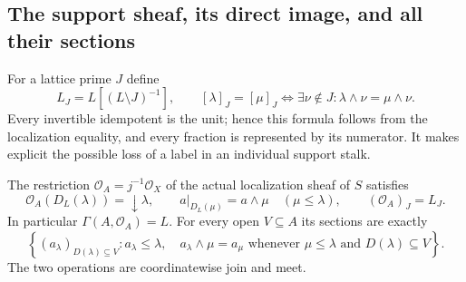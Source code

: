 \subsection{The support sheaf, its direct image, and all their sections}
For a lattice prime $J$ define
\begin{equation}\tag{FSC5}
 L_J=L[(L\setminus J)^{-1}],\qquad
 [\lambda]_J=[\mu]_J\iff
 \exists\nu\notin J:\lambda\wedge\nu=\mu\wedge\nu.
\end{equation}
Every invertible idempotent is the unit; hence this formula follows
from the localization equality, and every fraction is represented by
its numerator. It makes explicit the possible loss of a label in an
individual support stalk.

\begin{lemma}
The restriction $\mathcal O_A=j^{-1}\mathcal O_X$ of the actual
localization sheaf of $S$ satisfies
\begin{equation}\tag{FSC6}
 \mathcal O_A(D_L(\lambda))=\downarrow\lambda,\qquad
 a|_{D_L(\mu)}=a\wedge\mu\quad(\mu\le\lambda),\qquad
 (\mathcal O_A)_J=L_J.
\end{equation}
In particular $\Gamma(A,\mathcal O_A)=L$. For every open $V\subseteq A$
its sections are exactly
\begin{equation}\tag{FSC7}
 \left\{(a_\lambda)_{D(\lambda)\subseteq V}:
 a_\lambda\le\lambda,\quad
 a_\lambda\wedge\mu=a_\mu\text{ whenever }\mu\le\lambda
                         \text{ and }D(\lambda)\subseteq V\right\}.
\end{equation}
The two operations are coordinatewise join and meet.
\end{lemma}
